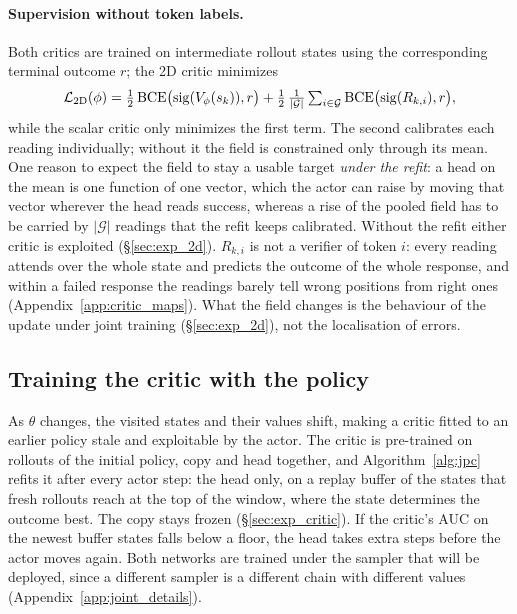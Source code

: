 \paragraph{Supervision without token labels.}
Both critics are trained on intermediate rollout states using the corresponding terminal outcome $r$; the 2D critic minimizes
\begin{equation}
\mathcal L_{\rm 2D}(\phi)=\tfrac12\,\mathrm{BCE}\big(\mathrm{sig}(V_\phi(s_k)),r\big)+\tfrac12\,\tfrac1{|\mathcal G|}\textstyle\sum_{i\in\mathcal G}\mathrm{BCE}\big(\mathrm{sig}(R_{k,i}),r\big),
\label{eq:critic2d_loss}
\end{equation}
while the scalar critic only minimizes the first term. The second calibrates each reading individually; without it the field is constrained only through its mean. One reason to expect the field to stay a usable target \emph{under the refit}: a head on the mean is one function of one vector, which the actor can raise by moving that vector wherever the head reads success, whereas a rise of the pooled field has to be carried by $|\mathcal G|$ readings that the refit keeps calibrated. Without the refit either critic is exploited (\S\ref{sec:exp_2d}). $R_{k,i}$ is not a verifier of token $i$: every reading attends over the whole state and predicts the outcome of the whole response, and within a failed response the readings barely tell wrong positions from right ones (Appendix~\ref{app:critic_maps}). What the field changes is the behaviour of the update under joint training (\S\ref{sec:exp_2d}), not the localisation of errors.

\subsection{Training the critic with the policy}
\label{sec:joint}
As $\theta$ changes, the visited states and their values shift, making a critic fitted to an earlier policy stale and exploitable by the actor. The critic is pre-trained on rollouts of the initial policy, copy and head together, and Algorithm~\ref{alg:jpc} refits it after every actor step: the head only, on a replay buffer of the states that fresh rollouts reach at the top of the window, where the state determines the outcome best. The copy stays frozen (\S\ref{sec:exp_critic}). If the critic's AUC on the newest buffer states falls below a floor, the head takes extra steps before the actor moves again. Both networks are trained under the sampler that will be deployed, since a different sampler is a different chain with different values (Appendix~\ref{app:joint_details}).

